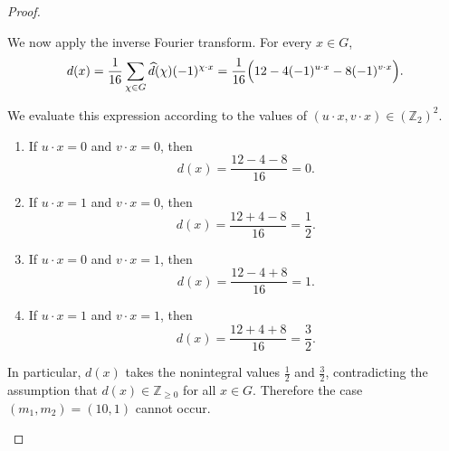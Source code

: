 \documentclass[10pt,a4paper]{amsart}
\begin{document}
\begin{proof}
\begin{enumerate}
We now apply the inverse Fourier transform. For every $x\in G$,
\[
d(x)
=
\frac{1}{16}\sum_{\chi\in G}\widehat d(\chi)(-1)^{\chi\cdot x}
=
\frac{1}{16}\Bigl(12-4(-1)^{u\cdot x}-8(-1)^{v\cdot x}\Bigr).
\]

We evaluate this expression according to the values of
$(u\cdot x,v\cdot x)\in(\mathbb Z_2)^2$.

\begin{enumerate}
\item If $u\cdot x=0$ and $v\cdot x=0$, then
\[
d(x)=\frac{12-4-8}{16}=0.
\]

\item If $u\cdot x=1$ and $v\cdot x=0$, then
\[
d(x)=\frac{12+4-8}{16}=\frac12.
\]

\item If $u\cdot x=0$ and $v\cdot x=1$, then
\[
d(x)=\frac{12-4+8}{16}=1.
\]

\item If $u\cdot x=1$ and $v\cdot x=1$, then
\[
d(x)=\frac{12+4+8}{16}=\frac32.
\]
\end{enumerate}

In particular, $d(x)$ takes the nonintegral values $\frac12$ and $\frac32$,
contradicting the assumption that $d(x)\in\mathbb Z_{\ge 0}$ for all $x\in G$.
Therefore the case $(m_1,m_2)=(10,1)$ cannot occur.



\end{enumerate}


\end{proof}
\end{document}
